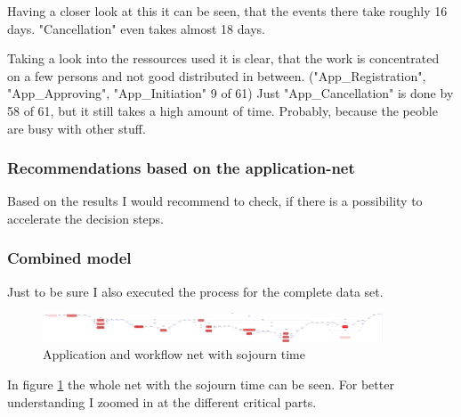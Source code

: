 Having a closer look at this it can be seen, that the events there take roughly 16 days. "Cancellation" even takes almost 18 days.

Taking a look into the ressources used it is clear, that the work is concentrated on a few persons and not good distributed in between. ("App\_Registration", "App\_Approving", "App\_Initiation" 9 of 61) Just "App\_Cancellation" is done by 58 of 61, but it still takes a high amount of time. Probably, because the peoble are busy with other stuff.

\subsubsection{Recommendations based on the application-net}

Based on the results I would recommend to check, if there is a possibility to accelerate the decision steps. 

\subsubsection{Combined model}

Just to be sure I also executed the process for the complete data set.

\begin{figure}[!htbp]
\centering
\includegraphics[width = 0.9\textwidth]{APP_Work_Bottle.PNG}
\caption{Application and workflow net with sojourn time}
\label{fig: AppWorkSojuComp}
\end{figure}

In figure \ref{fig: AppWorkSojuComp} the whole net with the sojourn time can be seen. For better understanding I zoomed in at the different critical parts.

